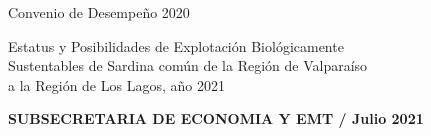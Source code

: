 \documentclass[12pt, oneside]{article} %
\begin{document}
\begin{titlepage}
\centering \fontsize{9pt}{8pt}\selectfont
            \vspace*{-3mm} 
            \hfill Convenio de Desempeño 2020 
            
\centering \fontsize{9pt}{8pt}\selectfont
            \vspace*{-16mm} 
            \hfill \begin{flushright}
            Estatus y Posibilidades de Explotación Biológicamente \\
            Sustentables de Sardina común de la  Región de Valparaíso \\ 
            a la Región de Los Lagos, año 2021 \\
              \end{flushright} 
            \vspace*{-5mm} 
            \hfill \textbf{SUBSECRETARIA DE ECONOMIA Y EMT / Julio 2021}



\end{titlepage}
\end{document}

